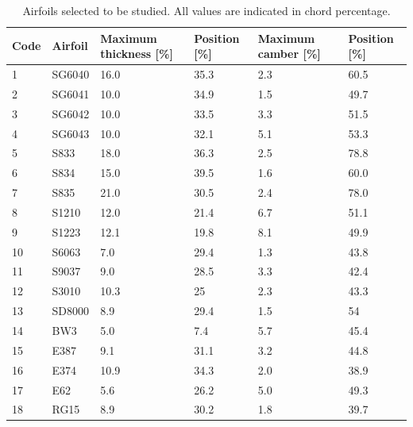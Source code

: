 \documentclass[../TFG_Report.tex]{subfiles}
\begin{document}
\begin{center}

	\begin{longtable}{C{1cm}|C{2cm}|C{2.2cm}C{1.5cm}|C{2.2cm}C{1.5cm}}
	\caption[Airfoils selected to be studied.]{Airfoils selected to be studied. All values are indicated in chord percentage.}	\label{tab:Airfoils_Studied}  \\ 
	Code &	Airfoil & Maximum thickness [\%]& Position [\%]   & Maximum camber [\%]& Position  [\%]                                \\ \hline {}&	SG6040  & 16.0           & 35.3                  & 2.3       & 60.5                \\
	2&	SG6041  & 10.0           & 34.9                 & 1.5       & 49.7                \\
	3&	SG6042  & 10.0           & 33.5                 & 3.3       & 51.5                \\
	4&	SG6043  & 10.0          & 32.1                  & 5.1       & 53.3               \\
	5&	S833    & 18.0           & 36.3                  & 2.5       & 78.8                  \\
	6&	S834    & 15.0           & 39.5                  & 1.6       & 60.0                    \\
	7&	S835    & 21.0           & 30.5                  & 2.4       & 78.0                   \\
	8&	S1210   &   12.0            &     21.4       &   6.7          &    51.1           \\
	9&	S1223   &   12.1          &     19.8          &     8.1        &  49.9               \\
	10&	S6063   &     7.0        &       29.4           &     1.3        &   43.8          \\
	11&	S9037   &     9.0        &    28.5              &   3.3    &       42.4          \\
	12&	S3010   &     10.3	     &  	25        &    2.3         &       43.3            \\
	13&	SD8000  &       8.9     &     29.4        &    1.5       &       54               \\
	14&	BW3     &      5.0           &      7.4        &    5.7         &    45.4             \\
	15&	E387    &      9.1        &      31.1       &     3.2        &    44.8           \\
	16&	E374    &    10.9         &    34.3         &    2.0       & 38.9             \\
	17&	E62     &     5.6            &       26.2       &     5.0        &      49.3         \\
	18&	RG15    &      8.9           &      30.2            &    1.8         &  39.7		
	\end{longtable}

\end{center}
\end{document}
